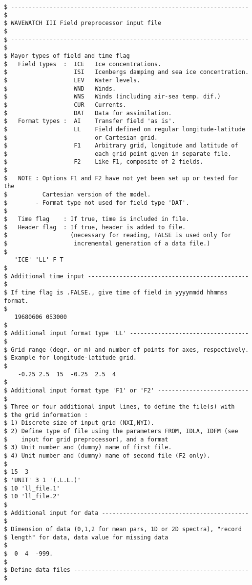 \begin{verbatim}
$ -------------------------------------------------------------------- $
$ WAVEWATCH III Field preprocessor input file                          $
$ -------------------------------------------------------------------- $
$ Mayor types of field and time flag
$   Field types  :  ICE   Ice concentrations.
$                   ISI   Icenbergs damping and sea ice concentration.
$                   LEV   Water levels.
$                   WND   Winds.
$                   WNS   Winds (including air-sea temp. dif.)
$                   CUR   Currents.
$                   DAT   Data for assimilation.
$   Format types :  AI    Transfer field 'as is'.
$                   LL    Field defined on regular longitude-latitude
$                         or Cartesian grid.
$                   F1    Arbitrary grid, longitude and latitude of
$                         each grid point given in separate file.
$                   F2    Like F1, composite of 2 fields.
$
$   NOTE : Options F1 and F2 have not yet been set up or tested for the
$          Cartesian version of the model.
$        - Format type not used for field type 'DAT'.
$
$   Time flag    : If true, time is included in file.
$   Header flag  : If true, header is added to file.
$                  (necessary for reading, FALSE is used only for
$                   incremental generation of a data file.)
$
   'ICE' 'LL' F T
$
$ Additional time input ---------------------------------------------- $
$ If time flag is .FALSE., give time of field in yyyymmdd hhmmss format.
$
   19680606 053000
$
$ Additional input format type 'LL' ---------------------------------- $
$ Grid range (degr. or m) and number of points for axes, respectively.
$ Example for longitude-latitude grid.
$
    -0.25 2.5  15  -0.25  2.5  4
$
$ Additional input format type 'F1' or 'F2' -------------------------- $
$ Three or four additional input lines, to define the file(s) with
$ the grid information :
$ 1) Discrete size of input grid (NXI,NYI).
$ 2) Define type of file using the parameters FROM, IDLA, IDFM (see
$    input for grid preprocessor), and a format
$ 3) Unit number and (dummy) name of first file.
$ 4) Unit number and (dummy) name of second file (F2 only).
$
$ 15  3                                              
$ 'UNIT' 3 1 '(.L.L.)'
$ 10 'll_file.1'
$ 10 'll_file.2'      
$
$ Additional input for data ------------------------------------------ $
$ Dimension of data (0,1,2 for mean pars, 1D or 2D spectra), "record
$ length" for data, data value for missing data
$
$  0  4  -999.
$
$ Define data files -------------------------------------------------- $

\end{verbatim}
